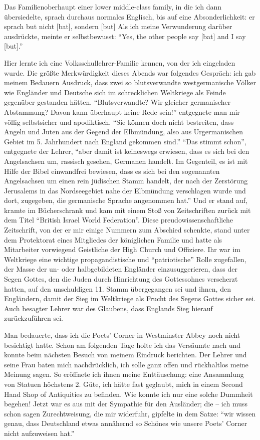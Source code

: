 \documentclass[a5paper,pagesize,10pt,twoside=true]{scrbook}
\begin{document}
Das Familienoberhaupt einer lower middle-class family, in die ich dann übersiedelte, sprach durchaus normales Englisch, bis auf eine Absonderlichkeit: er sprach but nicht [bat], sondern [but] Als ich meine Verwunderung darüber ausdrückte, meinte er selbstbewusst: \enquote{Yes, the other people say [bat] and I say [but].}

Hier lernte ich eine Volksschullehrer-Familie kennen, von der ich eingeladen wurde. Die größte Merkwürdigkeit dieses Abends war folgendes Gespräch: ich gab meinem Bedauern Ausdruck, dass zwei so blutsverwandte westgermanische Völker wie Engländer und Deutsche sich im schrecklichen Weltkriege als Feinde gegenüber gestanden hätten. \enquote{Blutsverwandte? Wir gleicher germanischer Abstammung? Davon kann überhaupt keine Rede sein!} entgegnete man mir völlig selbstsicher und apodiktisch. \enquote{Sie können doch nicht bestreiten, dass Angeln und Juten aus der Gegend der Elbmündung, also aus Urgermanischen Gebiet im 5. Jahrhundert nach England gekommen sind.} \enquote{Das stimmt schon}, entgegnete der Lehrer, \enquote{aber damit ist keineswegs erwiesen, dass es sich bei den Angelsachsen um, rassisch gesehen, Germanen handelt. Im Gegenteil, es ist mit Hilfe der Bibel einwandfrei bewiesen, dass es sich bei den sogenannten Angelsachsen um einen rein jüdischen Stamm handelt, der nach der Zerstörung Jerusalems in das Nordseegebiet nahe der Elbmündung verschlagen wurde und dort, zugegeben, die germanische Sprache angenommen hat.} Und er stand auf, kramte im Bücherschrank und kam mit einem Stoß von Zeitschriften zurück mit dem Titel \enquote{British Israel World Federation}. Diese preudowissenschaftliche Zeitschrift, von der er mir einige Nummern zum Abschied schenkte, stand unter dem Protektorat eines Mitgliedes der königlichen Familie und hatte als Mitarbeiter vorwiegend Geistliche der High Church und Offiziere. Ihr war im Weltkriege eine wichtige propagandistische und \enquote{patriotische} Rolle zugefallen, der Masse der un- oder halbgebildeten Engländer einzusuggerieren, dass der Segen Gottes, den die Juden durch Hinrichtung des Gottessohnes verscherzt hatten, auf den unschuldigen 11. Stamm übergegangen sei und ihnen, den Engländern, damit der Sieg im Weltkriege als Frucht des Segens Gottes sicher sei. Auch besagter Lehrer war des Glaubens, dass Englands Sieg hierauf zurückzuführen sei.

Man bedauerte, dass ich die Poets' Corner in Westminster Abbey noch nicht besichtigt hatte. Schon am folgenden Tage holte ich das Versäumte nach und konnte beim nächsten Besuch von meinem Eindruck berichten. Der Lehrer und seine Frau baten mich nachdrücklich, ich solle ganz offen und rückhaltlos meine Meinung sagen. So eröffnete ich ihnen meine Enttäuschung: eine Ansammlung von Statuen höchstens 2. Güte, ich hätte fast geglaubt, mich in einem Second Hand Shop of Antiquities zu befinden. Wie konnte ich nur eine solche Dummheit begehen! Jetzt war es aus mit der Sympathie für den Ausländer; die -- ich muss schon sagen Zurechtweisung, die mir widerfuhr, gipfelte in dem Satze: \enquote{wir wissen genau, dass Deutschland etwas annähernd so Schönes wie unsere Poets' Corner nicht aufzuweisen hat.}
\end{document}
